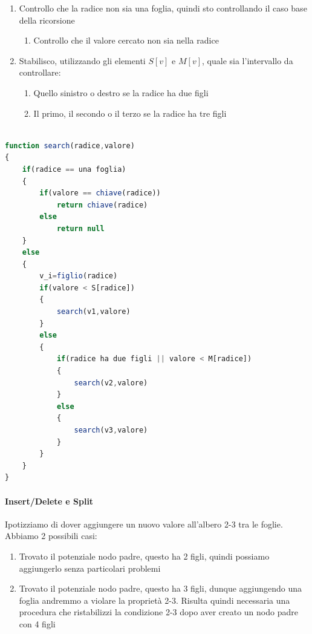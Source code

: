\documentclass{article}
\begin{document}
\begin{enumerate}
    \item Controllo che la radice non sia una foglia, quindi sto controllando il caso base della ricorsione
    \begin{enumerate}
        \item Controllo che il valore cercato non sia nella radice
    \end{enumerate}
    \item Stabilisco, utilizzando gli elementi $S[v]$ e $M[v]$, quale sia l'intervallo da controllare:
    \begin{enumerate}
        \item Quello sinistro o destro se la radice ha due figli
        \item Il primo, il secondo o il terzo se la radice ha tre figli
    \end{enumerate}
\end{enumerate}

\newpage

\begin{lstlisting}[language=JavaScript]

function search(radice,valore)
{
	if(radice == una foglia)
	{
		if(valore == chiave(radice))
			return chiave(radice)
		else
			return null
	}
	else
	{
		v_i=figlio(radice)
		if(valore < S[radice])
		{
			search(v1,valore)
		}
		else
		{
			if(radice ha due figli || valore < M[radice])
			{
				search(v2,valore)
			}
			else
			{
				search(v3,valore)
			}
		}
	}
}

\end{lstlisting}

\newpage

\paragraph{Insert/Delete e Split} Ipotizziamo di dover aggiungere un nuovo valore all'albero 2-3 tra le foglie. Abbiamo 2 possibili casi:

\begin{enumerate}
    \item Trovato il potenziale nodo padre, questo ha 2 figli, quindi possiamo aggiungerlo senza particolari problemi
    \item Trovato il potenziale nodo padre, questo ha 3 figli, dunque aggiungendo una foglia andremmo a violare la proprietà 2-3. Risulta quindi necessaria una procedura che ristabilizzi la condizione 2-3 dopo aver creato un nodo padre con 4 figli
\end{enumerate}
\end{document}
